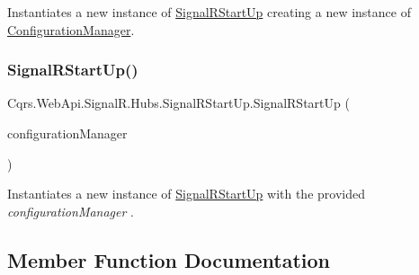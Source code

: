 Instantiates a new instance of \hyperlink{classCqrs_1_1WebApi_1_1SignalR_1_1Hubs_1_1SignalRStartUp}{Signal\+R\+Start\+Up} creating a new instance of \hyperlink{classCqrs_1_1WebApi_1_1SignalR_1_1Hubs_1_1SignalRStartUp_a0c137e0c86431dc944d7a3415de011bb_a0c137e0c86431dc944d7a3415de011bb}{Configuration\+Manager}. 

\mbox{\label{classCqrs_1_1WebApi_1_1SignalR_1_1Hubs_1_1SignalRStartUp_a52cbff947cf5da34dd8487c60ab85321_a52cbff947cf5da34dd8487c60ab85321}} 
\subsubsection{\texorpdfstring{Signal\+R\+Start\+Up()}{SignalRStartUp()}\hspace{0.1cm}{\footnotesize\ttfamily [2/2]}}
{\footnotesize\ttfamily Cqrs.\+Web\+Api.\+Signal\+R.\+Hubs.\+Signal\+R\+Start\+Up.\+Signal\+R\+Start\+Up (\begin{DoxyParamCaption}\item[{\hyperlink{interfaceCqrs_1_1Configuration_1_1IConfigurationManager}{I\+Configuration\+Manager}}]{configuration\+Manager }\end{DoxyParamCaption})}



Instantiates a new instance of \hyperlink{classCqrs_1_1WebApi_1_1SignalR_1_1Hubs_1_1SignalRStartUp}{Signal\+R\+Start\+Up} with the provided {\itshape configuration\+Manager} . 



\subsection{Member Function Documentation}
\mbox{\label{classCqrs_1_1WebApi_1_1SignalR_1_1Hubs_1_1SignalRStartUp_a0d670a1f640c6fd19edda463fe708879_a0d670a1f640c6fd19edda463fe708879}} 
